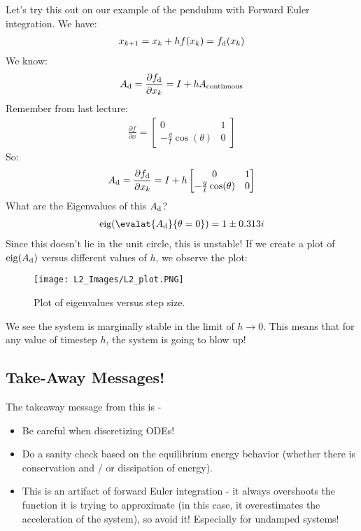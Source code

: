 \noindent
Let's try this out on our example of the pendulum with Forward Euler integration.
We have:
\begin{align}
    x_{k+1} = x_{k} + h f(x_k) = f_{\rm d} (x_k)
\end{align}
We know:
\begin{align}
    A_{\rm d} = \frac{\partial f_{\rm d}}{\partial x_k} = I + h A_{\rm continuous}
\end{align}
Remember from last lecture:
\begin{align}
    \frac{\partial f}{\partial x} = \begin{bmatrix}
        0 & 1 \\
        - \frac{g}{l} \cos(\theta) & 0
    \end{bmatrix}
\end{align}
So:
\begin{align}
    A_{\rm d} = \frac{\partial f_{\rm d}}{\partial x_k} = I + h \begin{bmatrix}
        0 & 1 \\
        - \frac{g}{l} \cos(\theta) & 0
    \end{bmatrix}
\end{align}
What are the Eigenvalues of this $A_{\rm d}$?
\begin{align}
    \textrm{eig} ( \evalat{A_{\rm d}}{\theta=0} ) = 1 \pm 0.313 i
\end{align}
Since this doesn't lie in the unit circle, this is unstable!
If we create a plot of $\textrm{eig}(A_{\rm d})$ versus different values of $h$, we observe the plot:
\begin{figure}
    \centering
    \texttt{[image: L2\_Images/L2\_plot.PNG]}
    \caption{Plot of eigenvalues versus step size.}
    \label{fig:l2f1}
\end{figure}
We see the system is marginally stable in the limit of $h \rightarrow 0$. This means that for any value of timestep $h$, the system is going to blow up!

\subsection{Take-Away Messages!}
The takeaway message from this is -
\begin{itemize}
    \item Be careful when discretizing ODEs!
    \item Do a sanity check based on the equilibrium energy behavior (whether there is conservation and / or dissipation of energy).
    \item This is an artifact of forward Euler integration - it always overshoots the function it is trying to approximate (in this case, it overestimates the acceleration of the system), so avoid it!
    Especially for undamped systems!
\end{itemize}

